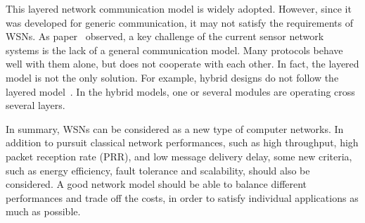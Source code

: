     This layered network communication model is widely adopted. However, since it was developed for generic communication, it may not satisfy the requirements of WSNs. As paper~\cite{CullerPlostreSNA} observed, a key challenge of the current sensor network systems is the lack of a general communication model. Many protocols behave well with them alone, but does not cooperate with each other. In fact, the layered model is not the only solution. For example, hybrid designs do not follow the layered model~\cite{CullerPlostreSNA,AkyildizSurveySN}. In the hybrid models, one or several modules are operating cross several layers.

    In summary, WSNs can be considered as a new type of computer networks. In addition to pursuit classical network performances, such as high throughput, high packet reception rate (PRR), and low message delivery delay, some new criteria, such as energy efficiency, fault tolerance and scalability, should also be considered.
        A good network model should be able to balance different performances and trade off the costs, in order to satisfy individual applications as much as possible.



